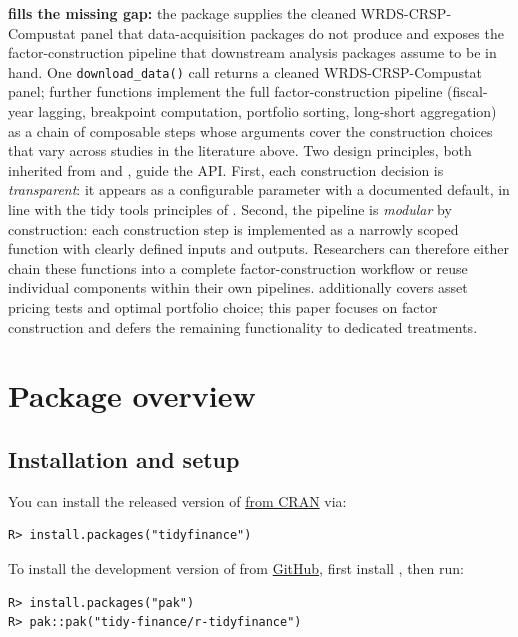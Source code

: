 \documentclass[
  article]{jss}
\begin{document}
\textbf{ fills the missing gap:} the package supplies
the cleaned WRDS-CRSP-Compustat panel that data-acquisition packages do
not produce and exposes the factor-construction pipeline that downstream
analysis packages assume to be in hand. One \texttt{download\_data()}
call returns a cleaned WRDS-CRSP-Compustat panel; further functions
implement the full factor-construction pipeline (fiscal-year lagging,
breakpoint computation, portfolio sorting, long-short aggregation) as a
chain of composable steps whose arguments cover the construction choices
that vary across studies in the literature above. Two design principles,
both inherited from \citet{scheuch.2023} and \citet{scheuch.2024}, guide
the API. First, each construction decision is \emph{transparent}: it
appears as a configurable parameter with a documented default, in line
with the tidy tools principles of \citet{wickham.2023}. Second, the
pipeline is \emph{modular} by construction: each construction step is
implemented as a narrowly scoped function with clearly defined inputs
and outputs. Researchers can therefore either chain these functions into
a complete factor-construction workflow or reuse individual components
within their own pipelines.  additionally covers asset
pricing tests and optimal portfolio choice; this paper focuses on factor
construction and defers the remaining functionality to dedicated
treatments.

\section{Package overview}\label{sec-overview}

\subsection{Installation and setup}\label{sec-installation}

You can install the released version of 
\href{https://cran.r-project.org/package=tidyfinance}{from CRAN} via:

\begin{verbatim}
R> install.packages("tidyfinance")
\end{verbatim}

To install the development version of  from
\href{https://github.com/tidy-finance/r-tidyfinance}{GitHub}, first
install , then run:

\begin{verbatim}
R> install.packages("pak")
R> pak::pak("tidy-finance/r-tidyfinance")
\end{verbatim}
\end{document}

